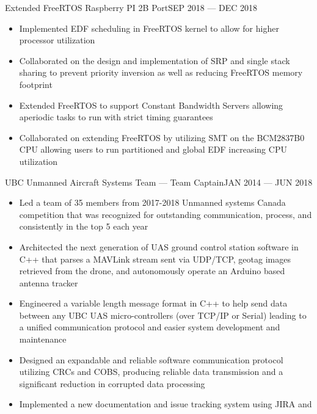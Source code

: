 
\begin{projects}
    \project
    {Extended FreeRTOS Raspberry PI 2B Port}{SEP 2018 --- DEC 2018}{}{
        \begin{itemize}
        \item Implemented EDF scheduling in FreeRTOS kernel to allow for higher processor
              utilization
        \item Collaborated on the design and implementation of SRP and single stack sharing to
              prevent priority inversion as well as reducing FreeRTOS memory footprint
        \item Extended FreeRTOS to support Constant Bandwidth Servers allowing aperiodic tasks to
              run with strict timing guarantees
        \item Collaborated on extending FreeRTOS by utilizing SMT on the BCM2837B0 CPU allowing
              users to run partitioned and global EDF increasing CPU utilization
        \end{itemize}
    }
    \project
    {UBC Unmanned Aircraft Systems Team --- Team Captain}{JAN 2014 --- JUN 2018}
    {}{
        \begin{itemize}
            \item Led a team of 35 members from 2017-2018 Unmanned systems Canada competition that
                  was recognized for outstanding communication, process, and consistently in the top
                  5 each year
            \item Architected the next generation of UAS ground control station software in C++ that
                  parses a MAVLink stream sent via UDP/TCP, geotag images retrieved from the drone,
                  and autonomously operate an Arduino based antenna tracker
            \item Engineered a variable length message format in C++ to help send data between any
                  UBC UAS micro-controllers (over TCP/IP or Serial) leading to a unified
                  communication protocol and easier system development and maintenance
            \item Designed an expandable and reliable software communication protocol utilizing
                  CRCs and COBS, producing reliable data transmission and a significant reduction
                  in corrupted data processing
            \item Implemented a new documentation and issue tracking system using JIRA and

\end{itemize}}
\end{projects}
